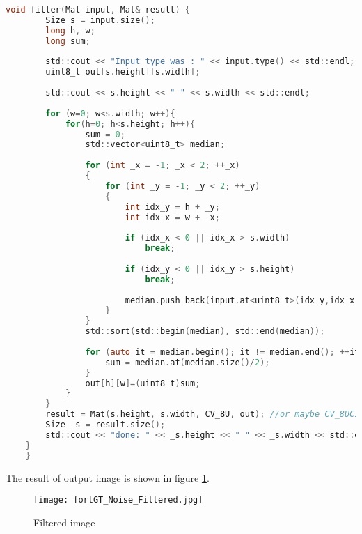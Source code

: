 \begin{lstlisting}[language=C, caption=Noise correction filter, label=lst:noise_filter]
    void filter(Mat input, Mat& result) {
        Size s = input.size();
        long h, w;
        long sum;
        
        std::cout << "Input type was : " << input.type() << std::endl;
        uint8_t out[s.height][s.width];
        
        std::cout << s.height << " " << s.width << std::endl;
        
        for (w=0; w<s.width; w++){
            for(h=0; h<s.height; h++){
                sum = 0;
                std::vector<uint8_t> median;
                
                for (int _x = -1; _x < 2; ++_x)
                {
                    for (int _y = -1; _y < 2; ++_y)
                    {
                        int idx_y = h + _y;
                        int idx_x = w + _x;
                        
                        if (idx_x < 0 || idx_x > s.width)
                            break;
                            
                        if (idx_y < 0 || idx_y > s.height)
                            break;
                        
                        median.push_back(input.at<uint8_t>(idx_y,idx_x));
                    }
                }
                std::sort(std::begin(median), std::end(median));
                        
                for (auto it = median.begin(); it != median.end(); ++it) {
                    sum = median.at(median.size()/2);
                }
                out[h][w]=(uint8_t)sum;
            }
        }
        result = Mat(s.height, s.width, CV_8U, out); //or maybe CV_8UC1?
        Size _s = result.size();
        std::cout << "done: " << _s.height << " " << _s.width << std::endl;
    }
    }
\end{lstlisting}


The result of output image is shown in figure \ref{fig:fortGT_Noise_Filtered}.

\begin{figure}[h!]
    \centering
    \texttt{[image: fortGT\_Noise\_Filtered.jpg]}
    \caption{Filtered image}
    \label{fig:fortGT_Noise_Filtered}
\end{figure}